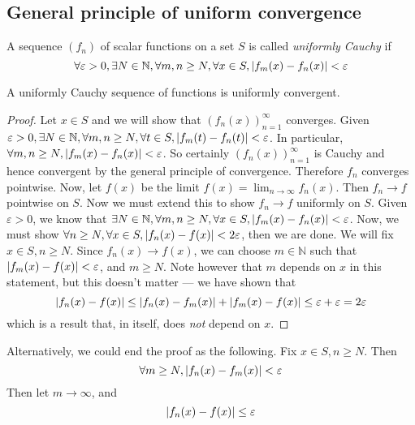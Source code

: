 \subsection{General principle of uniform convergence}
\begin{definition}
	A sequence \( (f_n) \) of scalar functions on a set \( S \) is called \textit{uniformly Cauchy} if
	\[
		\forall \varepsilon > 0, \exists N \in \mathbb N, \forall m, n \geq N, \forall x \in S, \abs{f_m(x) - f_n(x)} < \varepsilon
	\]
\end{definition}
\begin{theorem}
	A uniformly Cauchy sequence of functions is uniformly convergent.
\end{theorem}
\begin{proof}
	Let \( x \in S \) and we will show that \( (f_n(x))_{n=1}^\infty \) converges.
	Given \( \varepsilon > 0, \exists N \in \mathbb N, \forall m, n \geq N, \forall t \in S, \abs{f_m(t) - f_n(t)} < \varepsilon \).
	In particular, \( \forall m,n \geq N, \abs{f_m(x) - f_n(x)} < \varepsilon \).
	So certainly \( (f_n(x))_{n=1}^\infty \) is Cauchy and hence convergent by the general principle of convergence.
	Therefore \( f_n \) converges pointwise.
	Now, let \( f(x) \) be the limit \( f(x) = \lim_{n\to\infty} f_n(x) \).
	Then \( f_n \to f \) pointwise on \( S \).
	Now we must extend this to show \( f_n \to f \) uniformly on \( S \).
	Given \( \varepsilon > 0 \), we know that \( \exists N \in \mathbb N, \forall m, n \geq N, \forall x \in S, \abs{f_m(x) - f_n(x)} < \varepsilon \).
	Now, we must show \( \forall n \geq N, \forall x \in S, \abs{f_n(x) - f(x)} < 2 \varepsilon \), then we are done.
	We will fix \( x \in S, n \geq N \).
	Since \( f_n(x) \to f(x) \), we can choose \( m \in \mathbb N \) such that \( \abs{f_m(x) - f(x)} < \varepsilon \), and \( m \geq N \).
	Note however that \( m \) depends on \( x \) in this statement, but this doesn't matter --- we have shown that
	\[
		\abs{f_n(x) - f(x)} \leq \abs{f_n(x) - f_m(x)} + \abs{f_m(x) - f(x)} \leq \varepsilon + \varepsilon = 2 \varepsilon
	\]
	which is a result that, in itself, does \textit{not} depend on \( x \).
\end{proof}
\begin{note}
	Alternatively, we could end the proof as the following.
	Fix \( x \in S, n \geq N \).
	Then
	\[
		\forall m \geq N, \abs{f_n(x) - f_m(x)} < \varepsilon
	\]
	Then let \( m \to \infty \), and
	\[
		\abs{f_n(x) - f(x)} \leq \varepsilon
	\]
\end{note}

